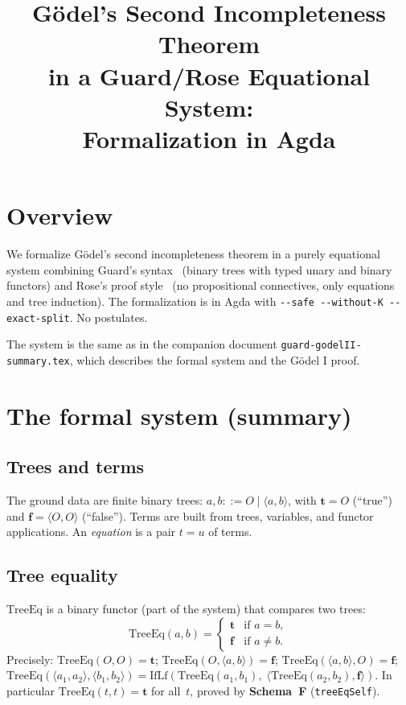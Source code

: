 \documentclass[11pt]{article}
\title{G\"odel's Second Incompleteness Theorem\\
  in a Guard/Rose Equational System:\\
  Formalization in Agda}
\author{}
\date{}
\newcommand{\pair}[2]{\langle #1, #2 \rangle}
\newcommand{\trueT}{\mathbf{t}}
\newcommand{\falseT}{\mathbf{f}}
\newcommand{\SchemaF}{\textbf{Schema~F}}
\newcommand{\TreeEq}{\mathrm{TreeEq}}
\newcommand{\IfLf}{\mathrm{IfLf}}
\begin{document}
\maketitle

\section{Overview}

We formalize G\"odel's second incompleteness theorem in a purely
equational system combining Guard's syntax~\cite{guard1963}
(binary trees with typed unary and binary functors) and Rose's
proof style~\cite{rose1961} (no propositional connectives, only
equations and tree induction).  The formalization is in Agda with
\texttt{-{}-safe -{}-without-K -{}-exact-split}.  No postulates.

The system is the same as in the companion document
\texttt{guard-godelII-summary.tex}, which describes the formal
system and the G\"odel I proof.

\section{The formal system (summary)}

\subsection*{Trees and terms}
The ground data are finite binary trees:
$a, b ::= O \mid \pair{a}{b}$,
with $\trueT = O$ (``true'') and $\falseT = \pair{O}{O}$ (``false'').
Terms are built from trees, variables, and functor applications.
An \emph{equation} is a pair $t = u$ of terms.

\subsection*{Tree equality}
$\TreeEq$ is a binary functor (part of the system) that compares
two trees:
\[
  \TreeEq(a, b) = \begin{cases}
    \trueT & \text{if } a = b, \\
    \falseT & \text{if } a \neq b.
  \end{cases}
\]
Precisely: $\TreeEq(O, O) = \trueT$;
$\TreeEq(O, \pair{a}{b}) = \falseT$;
$\TreeEq(\pair{a}{b}, O) = \falseT$;
$\TreeEq(\pair{a_1}{a_2}, \pair{b_1}{b_2})
  = \IfLf(\TreeEq(a_1, b_1),\; \pair{\TreeEq(a_2, b_2)}{\falseT})$.
In particular $\TreeEq(t, t) = \trueT$ for all~$t$,
proved by \SchemaF{} (\texttt{treeEqSelf}).
\end{document}
